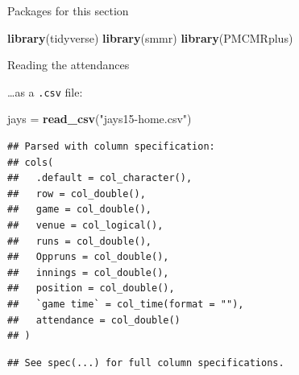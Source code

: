 \documentclass[
  ignorenonframetext,
]{beamer}
\newenvironment{Shaded}{\begin{snugshade}}{\end{snugshade}}
\newcommand{\KeywordTok}[1]{\textcolor[rgb]{0.13,0.29,0.53}{\textbf{#1}}}
\newcommand{\NormalTok}[1]{#1}
\newcommand{\StringTok}[1]{\textcolor[rgb]{0.31,0.60,0.02}{#1}}
\begin{document}
\begin{frame}[fragile]{Packages for this section}
\protect\hypertarget{packages-for-this-section-3}{}

\begin{Shaded}
\begin{Highlighting}[]
\KeywordTok{library}\NormalTok{(tidyverse)}
\KeywordTok{library}\NormalTok{(smmr)}
\KeywordTok{library}\NormalTok{(PMCMRplus)}
\end{Highlighting}
\end{Shaded}

\end{frame}

\begin{frame}[fragile]{Reading the attendances}
\protect\hypertarget{reading-the-attendances}{}

\ldots as a \texttt{.csv} file:

\begin{Shaded}
\begin{Highlighting}[]
\NormalTok{jays =}\StringTok{ }\KeywordTok{read_csv}\NormalTok{(}\StringTok{"jays15-home.csv"}\NormalTok{)}
\end{Highlighting}
\end{Shaded}

\begin{verbatim}
## Parsed with column specification:
## cols(
##   .default = col_character(),
##   row = col_double(),
##   game = col_double(),
##   venue = col_logical(),
##   runs = col_double(),
##   Oppruns = col_double(),
##   innings = col_double(),
##   position = col_double(),
##   `game time` = col_time(format = ""),
##   attendance = col_double()
## )
\end{verbatim}

\begin{verbatim}
## See spec(...) for full column specifications.
\end{verbatim}

\end{frame}
\end{document}

